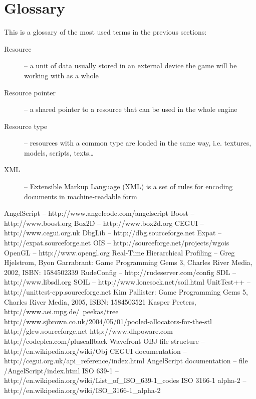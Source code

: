 \documentclass[a4paper, 12pt]{report}
\begin{document}
\section{Glossary}
This is a glossary of the most used terms in the previous sections:

\begin{description}
  \item[Resource] -- a unit of data usually stored in an external device the game will be working with as a whole
  \item[Resource pointer] -- a shared pointer to a resource that can be used in the whole engine
  \item[Resource type] -- resources with a common type are loaded in the same way, i.e. textures, models, scripts, texts\ldots
  \item[XML] -- Extensible Markup Language (XML) is a set of rules for encoding documents in machine-readable form
\end{description}


\begin{thebibliography}{9}
AngelScript -- http://www.angelcode.com/angelscript
Boost -- http://www.boost.org
Box2D -- http://www.box2d.org
CEGUI -- http://www.cegui.org.uk
DbgLib -- http://dbg.sourceforge.net
Expat -- http://expat.sourceforge.net
OIS -- http://sourceforge.net/projects/wgois
OpenGL -- http://www.opengl.org
Real-Time Hierarchical Profiling -- Greg Hjelstrom, Byon Garrabrant: Game Programming Gems 3, Charles River Media, 2002, ISBN: 1584502339
RudeConfig -- http://rudeserver.com/config
SDL -- http://www.libsdl.org
SOIL -- http://www.lonesock.net/soil.html
UnitTest++ -- http://unittest-cpp.sourceforge.net
Kim Pallister: Game Programming Gems 5, Charles River Media, 2005, ISBN: 1584503521
Kasper Peeters, http://www.aei.mpg.de/~peekas/tree
http://www.sjbrown.co.uk/2004/05/01/pooled-allocators-for-the-stl
http://glew.sourceforge.net
http://www.dhpoware.com
http://codeplea.com/pluscallback
Wavefront OBJ file structure -- http://en.wikipedia.org/wiki/Obj
CEGUI documentation -- http://cegui.org.uk/api\_reference/index.html
AngelScript documentation -- file /AngelScript/index.html
ISO 639-1 -- http://en.wikipedia.org/wiki/List\_of\_ISO\_639-1\_codes
ISO 3166-1 alpha-2 -- http://en.wikipedia.org/wiki/ISO\_3166-1\_alpha-2
\end{thebibliography}

\clearpage
{}
\listoffigures

\clearpage
{}
\listoftables
\end{document}
